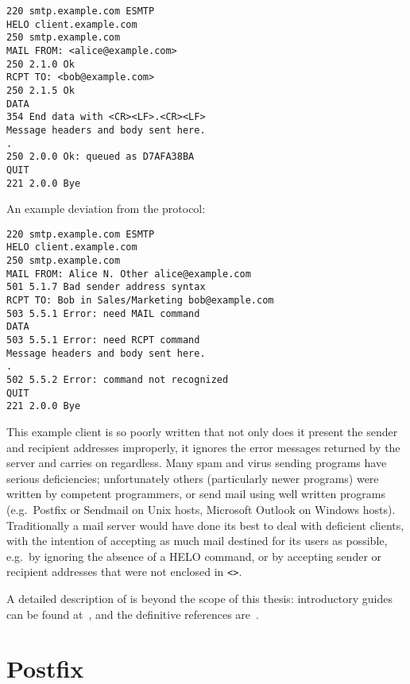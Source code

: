 \begin{verbatim}
220 smtp.example.com ESMTP
HELO client.example.com
250 smtp.example.com
MAIL FROM: <alice@example.com>
250 2.1.0 Ok
RCPT TO: <bob@example.com>
250 2.1.5 Ok
DATA
354 End data with <CR><LF>.<CR><LF>
Message headers and body sent here.
.
250 2.0.0 Ok: queued as D7AFA38BA
QUIT
221 2.0.0 Bye
\end{verbatim}

An example deviation from the protocol:

\begin{verbatim}
220 smtp.example.com ESMTP
HELO client.example.com
250 smtp.example.com
MAIL FROM: Alice N. Other alice@example.com
501 5.1.7 Bad sender address syntax
RCPT TO: Bob in Sales/Marketing bob@example.com
503 5.5.1 Error: need MAIL command
DATA
503 5.5.1 Error: need RCPT command
Message headers and body sent here.
.
502 5.5.2 Error: command not recognized
QUIT
221 2.0.0 Bye
\end{verbatim}

This example client is so poorly written that not only does it present the
sender and recipient addresses improperly, it ignores the error messages
returned by the server and carries on regardless.  Many spam and virus
sending programs have serious deficiencies; unfortunately others
(particularly newer programs) were written by competent programmers, or
send mail using well written programs (e.g.\ Postfix or Sendmail on Unix
hosts, Microsoft Outlook on Windows hosts).  Traditionally a mail server
would have done its best to deal with deficient clients, with the intention
of accepting as much mail destined for its users as possible, e.g.\ by
ignoring the absence of a HELO command, or by accepting sender or recipient
addresses that were not enclosed in \texttt{<>}.  

A detailed description of  is beyond the scope of this
thesis: introductory guides can be found
at~\cite{smtp-intro-01,smtp-intro-02}, and the definitive references
are~\cite{RFC821,RFC2821}.

\section{Postfix}

\label{postfix background}

